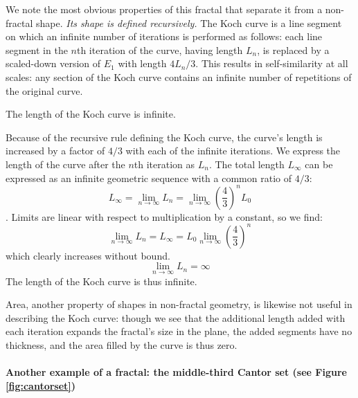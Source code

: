 We note the most obvious properties of this fractal that separate it from a non-fractal shape. 
\textit{Its shape is defined recursively.} The Koch curve is a line segment on which an infinite number of iterations is performed as follows: each line segment in the $n$th iteration of the curve, having length $L_n$, is replaced by a scaled-down version of $E_1$ with length $4L_n/3$. This results in self-similarity at all scales: any section of the Koch curve contains an infinite number of repetitions of the original curve. 

\begin{myproposition} The length of the Koch curve is infinite. \end{myproposition}
\begin{myproof}
Because of the recursive rule defining the Koch curve, the curve's length is increased by a factor of $ 4/3 $ with each of the infinite iterations. We express the length of the curve after the $n$th iteration as $L_n$. The total length $L_\infty$ can be expressed as an infinite geometric sequence with a common ratio of $ 4/3 $:
\begin{equation}
	L_\infty = \lim_{n \to \infty}L_n = \lim_{n \to \infty}\left(\frac{4}{3}\right)^n L_0
\end{equation}.
Limits are linear with respect to multiplication by a constant, so we find:
\begin{equation}
	\lim_{n \to \infty}L_n = L_\infty = L_0 \lim_{n \to \infty} \left(\frac{4}{3}\right)^n
\end{equation}
which clearly increases without bound.
\begin{equation}
	\lim_{n \to \infty}L_n = \infty 
\end{equation}
The length of the Koch curve is thus infinite.
\end{myproof}

Area, another property of shapes in non-fractal geometry, is likewise not useful in describing the Koch curve: though we see that the additional length added with each iteration expands the fractal's size in the plane, the added segments have no thickness, and the area filled by the curve is thus zero.

\paragraph{Another example of a fractal: the middle-third Cantor set (see Figure \ref{fig:cantorset})}

